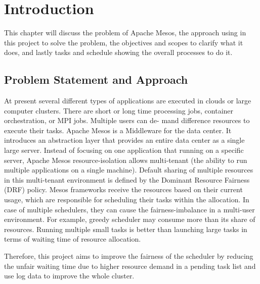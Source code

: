 \documentclass[12pt,oneside,openright,a4paper]{cpe-english-project}
\begin{document}


\chapter{Introduction}

\hspace{10mm}This chapter will discuss the problem of Apache Mesos, the approach using in this project to solve the problem, the objectives and scopes to clarify what it does, and lastly tasks and schedule showing the overall processes to do it.

\section{Problem Statement and Approach} 

\hspace{10mm}At present several different types of applications are executed in clouds or large computer clusters. There are short or long time processing jobs, container orchestration, or MPI jobs. Multiple users can de- mand difference resources to execute their tasks. Apache Mesos is a Middleware for the data center. It introduces an abstraction layer that provides an entire data center as a single large server. Instead of focusing on one application that running on a specific server, Apache Mesos resource-isolation allows multi-tenant (the ability to run multiple applications on a single machine). Default sharing of multiple resources in this multi-tenant environment is defined by the Dominant Resource Fairness (DRF) policy. Mesos frameworks receive the resources based on their current usage, which are responsible for scheduling their tasks within the allocation. In case of multiple schedulers, they can cause the fairness-imbalance in a multi-user environment. For example, greedy scheduler may consume more than its share of resources. Running multiple small tasks is better than launching large tasks in terms of waiting time of resource allocation.

\hspace{10mm}Therefore, this project aims to improve the fairness of the scheduler by reducing the unfair waiting time due to higher resource demand in a pending task list and use log data to improve the whole cluster.
\end{document}
